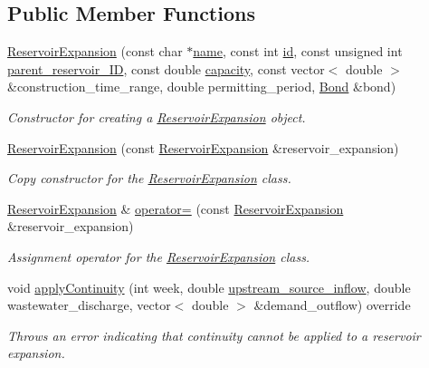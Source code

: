 \subsection*{Public Member Functions}
\begin{DoxyCompactItemize}
\item 
\mbox{\hyperlink{classReservoirExpansion_aa742cae4276e97847681dac4f828b5ae}{Reservoir\+Expansion}} (const char $\ast$\mbox{\hyperlink{classWaterSource_a846ea74c5b453d014f594d41fee8c765}{name}}, const int \mbox{\hyperlink{classWaterSource_a6eafe5dfefd317877d1244e8a7c6e742}{id}}, const unsigned int \mbox{\hyperlink{classReservoirExpansion_a56527196174404cfed20b863df2ab0ba}{parent\+\_\+reservoir\+\_\+\+ID}}, const double \mbox{\hyperlink{classWaterSource_a2ec257b415b248214a8bce7fc5267723}{capacity}}, const vector$<$ double $>$ \&construction\+\_\+time\+\_\+range, double permitting\+\_\+period, \mbox{\hyperlink{classBond}{Bond}} \&bond)
\begin{DoxyCompactList}\small\item\em Constructor for creating a \mbox{\hyperlink{classReservoirExpansion}{Reservoir\+Expansion}} object. \end{DoxyCompactList}\item 
\mbox{\hyperlink{classReservoirExpansion_abc10a6725f7fb85b7478fb6b0b79bd1e}{Reservoir\+Expansion}} (const \mbox{\hyperlink{classReservoirExpansion}{Reservoir\+Expansion}} \&reservoir\+\_\+expansion)
\begin{DoxyCompactList}\small\item\em Copy constructor for the \mbox{\hyperlink{classReservoirExpansion}{Reservoir\+Expansion}} class. \end{DoxyCompactList}\item 
\mbox{\hyperlink{classReservoirExpansion}{Reservoir\+Expansion}} \& \mbox{\hyperlink{classReservoirExpansion_a6c9607be0fc7ce624a19bc32fdff9222}{operator=}} (const \mbox{\hyperlink{classReservoirExpansion}{Reservoir\+Expansion}} \&reservoir\+\_\+expansion)
\begin{DoxyCompactList}\small\item\em Assignment operator for the \mbox{\hyperlink{classReservoirExpansion}{Reservoir\+Expansion}} class. \end{DoxyCompactList}\item 
void \mbox{\hyperlink{classReservoirExpansion_a18614050354dced5cc2747eeda0c2397}{apply\+Continuity}} (int week, double \mbox{\hyperlink{classWaterSource_a7a69b2e9b6030f1035e6cf44d2918ee5}{upstream\+\_\+source\+\_\+inflow}}, double wastewater\+\_\+discharge, vector$<$ double $>$ \&demand\+\_\+outflow) override
\begin{DoxyCompactList}\small\item\em Throws an error indicating that continuity cannot be applied to a reservoir expansion. \end{DoxyCompactList}\end{DoxyCompactItemize}
